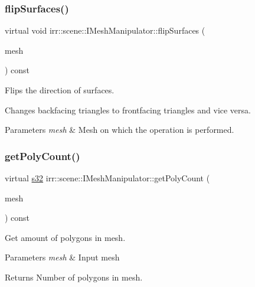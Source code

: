 \subsubsection{\texorpdfstring{flip\+Surfaces()}{flipSurfaces()}}
{\footnotesize\ttfamily virtual void irr\+::scene\+::\+I\+Mesh\+Manipulator\+::flip\+Surfaces (\begin{DoxyParamCaption}\item[{\hyperlink{classirr_1_1scene_1_1IMesh}{I\+Mesh} $\ast$}]{mesh }\end{DoxyParamCaption}) const\hspace{0.3cm}{\ttfamily [pure virtual]}}



Flips the direction of surfaces. 

Changes backfacing triangles to frontfacing triangles and vice versa. 
\begin{DoxyParams}{Parameters}
{\em mesh} & Mesh on which the operation is performed. \\
\hline
\end{DoxyParams}
\mbox{\label{classirr_1_1scene_1_1IMeshManipulator_a914c8cbfbde1428dea91b34fe99e716d}} 
\subsubsection{\texorpdfstring{get\+Poly\+Count()}{getPolyCount()}\hspace{0.1cm}{\footnotesize\ttfamily [1/2]}}
{\footnotesize\ttfamily virtual \hyperlink{namespaceirr_ac66849b7a6ed16e30ebede579f9b47c6}{s32} irr\+::scene\+::\+I\+Mesh\+Manipulator\+::get\+Poly\+Count (\begin{DoxyParamCaption}\item[{\hyperlink{classirr_1_1scene_1_1IMesh}{I\+Mesh} $\ast$}]{mesh }\end{DoxyParamCaption}) const\hspace{0.3cm}{\ttfamily [pure virtual]}}



Get amount of polygons in mesh. 


\begin{DoxyParams}{Parameters}
{\em mesh} & Input mesh \\
\hline
\end{DoxyParams}
\begin{DoxyReturn}{Returns}
Number of polygons in mesh. 
\end{DoxyReturn}
\mbox{\label{classirr_1_1scene_1_1IMeshManipulator_af20519dbaa2c2c346e8ddf7c94babc38}} 
